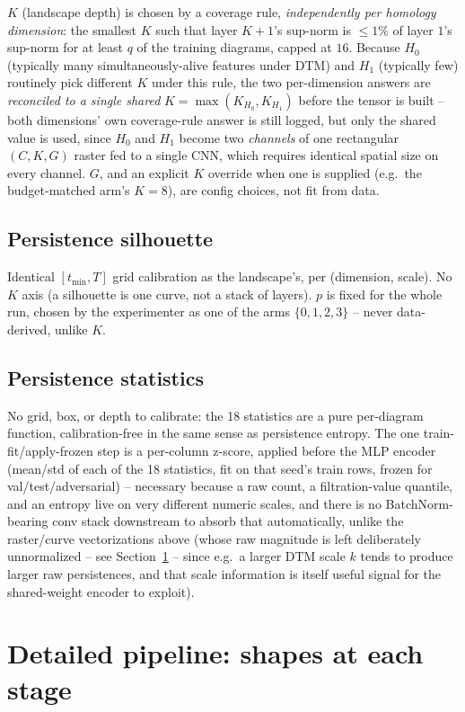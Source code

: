 \documentclass[11pt]{article}
\begin{document}
$K$ (landscape depth) is chosen by a coverage rule, \emph{independently per
homology dimension}: the smallest $K$ such that layer $K{+}1$'s sup-norm is
$\le 1\%$ of layer $1$'s sup-norm for at least $q$ of the training diagrams, capped at
$16$. Because $H_0$ (typically many simultaneously-alive features under DTM) and $H_1$
(typically few) routinely pick different $K$ under this rule, the two per-dimension
answers are \emph{reconciled to a single shared} $K = \max(K_{H_0}, K_{H_1})$ before
the tensor is built -- both dimensions' own coverage-rule answer is still logged, but
only the shared value is used, since $H_0$ and $H_1$ become two \emph{channels} of one
rectangular $(C,K,G)$ raster fed to a single CNN, which requires identical spatial
size on every channel. $G$, and an explicit $K$ override when one is supplied (e.g.\
the budget-matched arm's $K=8$), are config choices, not fit from data.

\subsection{Persistence silhouette}
Identical $[t_{\min},T]$ grid calibration as the landscape's, per (dimension, scale).
No $K$ axis (a silhouette is one curve, not a stack of layers). $p$ is fixed for the
whole run, chosen by the experimenter as one of the arms $\{0,1,2,3\}$ -- never
data-derived, unlike $K$.

\subsection{Persistence statistics}
No grid, box, or depth to calibrate: the 18 statistics are a pure per-diagram
function, calibration-free in the same sense as persistence entropy. The one
train-fit/apply-frozen step is a per-column z-score, applied before the MLP encoder
(mean/std of each of the 18 statistics, fit on that seed's train rows, frozen for
val/test/adversarial) -- necessary because a raw count, a filtration-value quantile,
and an entropy live on very different numeric scales, and there is no
BatchNorm-bearing conv stack downstream to absorb that automatically, unlike the
raster/curve vectorizations above (whose raw magnitude is left deliberately
unnormalized -- see Section~\ref{sec:shapes} -- since e.g.\ a larger DTM scale $k$
tends to produce larger raw persistences, and that scale information is itself
useful signal for the shared-weight encoder to exploit).

\section{Detailed pipeline: shapes at each stage}
\label{sec:shapes}
\end{document}
